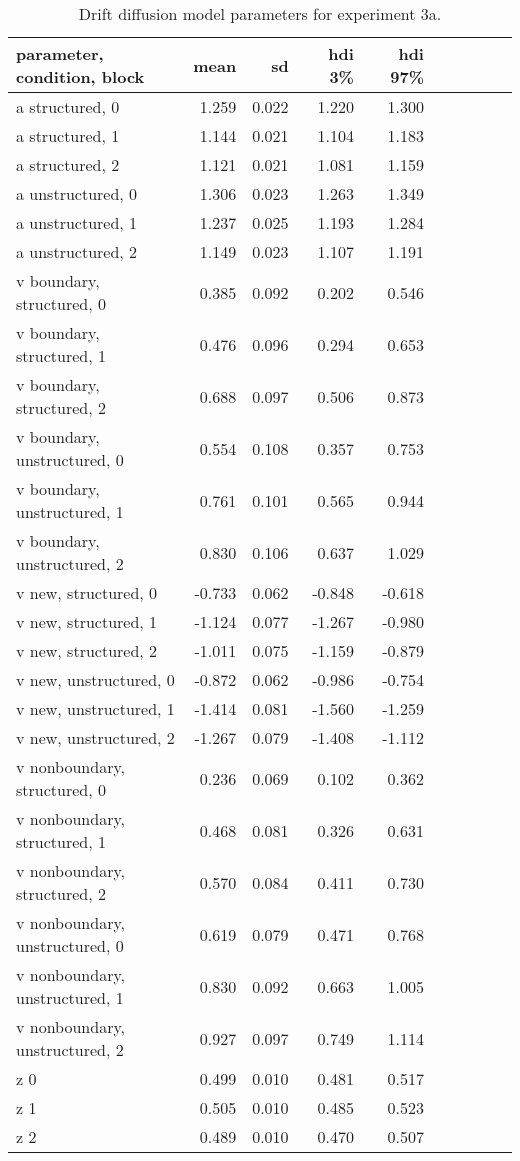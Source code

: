 \begin{table}
    \centering
    \label{tab:exp3-ddm-params}
    \caption{Drift diffusion model parameters for experiment 3a.}
    \begin{tabular}{lrrrrrrrrr}
        \toprule
        parameter, condition, block & mean & sd & hdi 3\% & hdi 97\% \\
        \midrule
        a structured, 0 & 1.259 & 0.022 & 1.220 & 1.300 \\
        a structured, 1 & 1.144 & 0.021 & 1.104 & 1.183 \\
        a structured, 2 & 1.121 & 0.021 & 1.081 & 1.159 \\
        a unstructured, 0 & 1.306 & 0.023 & 1.263 & 1.349 \\
        a unstructured, 1 & 1.237 & 0.025 & 1.193 & 1.284 \\
        a unstructured, 2 & 1.149 & 0.023 & 1.107 & 1.191 \\
        v boundary, structured, 0 & 0.385 & 0.092 & 0.202 & 0.546 \\
        v boundary, structured, 1 & 0.476 & 0.096 & 0.294 & 0.653 \\
        v boundary, structured, 2 & 0.688 & 0.097 & 0.506 & 0.873 \\
        v boundary, unstructured, 0 & 0.554 & 0.108 & 0.357 & 0.753 \\
        v boundary, unstructured, 1 & 0.761 & 0.101 & 0.565 & 0.944 \\
        v boundary, unstructured, 2 & 0.830 & 0.106 & 0.637 & 1.029 \\
        v new, structured, 0 & -0.733 & 0.062 & -0.848 & -0.618 \\
        v new, structured, 1 & -1.124 & 0.077 & -1.267 & -0.980 \\
        v new, structured, 2 & -1.011 & 0.075 & -1.159 & -0.879 \\
        v new, unstructured, 0 & -0.872 & 0.062 & -0.986 & -0.754 \\
        v new, unstructured, 1 & -1.414 & 0.081 & -1.560 & -1.259 \\
        v new, unstructured, 2 & -1.267 & 0.079 & -1.408 & -1.112 \\
        v nonboundary, structured, 0 & 0.236 & 0.069 & 0.102 & 0.362 \\
        v nonboundary, structured, 1 & 0.468 & 0.081 & 0.326 & 0.631 \\
        v nonboundary, structured, 2 & 0.570 & 0.084 & 0.411 & 0.730 \\
        v nonboundary, unstructured, 0 & 0.619 & 0.079 & 0.471 & 0.768 \\
        v nonboundary, unstructured, 1 & 0.830 & 0.092 & 0.663 & 1.005 \\
        v nonboundary, unstructured, 2 & 0.927 & 0.097 & 0.749 & 1.114 \\
        z 0 & 0.499 & 0.010 & 0.481 & 0.517 \\
        z 1 & 0.505 & 0.010 & 0.485 & 0.523 \\
        z 2 & 0.489 & 0.010 & 0.470 & 0.507 \\
        \bottomrule
        \end{tabular}
        

\end{table}
